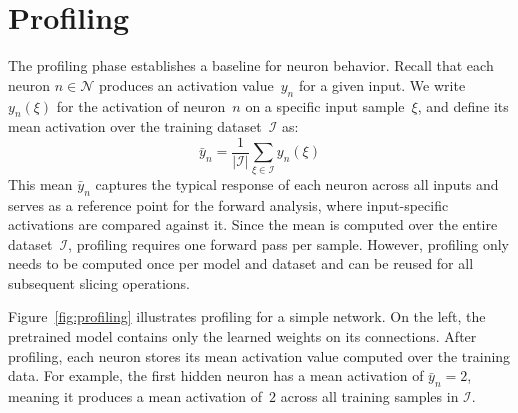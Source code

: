 \documentclass[
12pt,
fancyheadings,
a4paper,
twoside,
BCOR=0.7cm,
nobcorignoretitle,
grayscalebody,
]{stsreprt}
\begin{document}
\section{Profiling}

The profiling phase establishes a baseline for neuron behavior.
Recall that each neuron $n \in \mathcal{N}$ produces an activation value~$y_n$ for a given input.
We write $y_n(\xi)$ for the activation of neuron~$n$ on a specific input sample~$\xi$, and define
its mean activation over the training dataset~$\mathcal{I}$ as:
\begin{equation}
    \bar{y}_n = \frac{1}{|\mathcal{I}|} \sum_{\xi \in \mathcal{I}} y_n(\xi)
\end{equation}
This mean $\bar{y}_n$ captures the typical response of each neuron across all inputs and serves as
a reference point for the forward analysis, where input-specific activations are compared against
it.
Since the mean is computed over the entire dataset~$\mathcal{I}$, profiling requires one forward
pass per sample.
However, profiling only needs to be computed once per model and dataset and can be reused for all
subsequent slicing operations.

Figure~\ref{fig:profiling} illustrates profiling for a simple network.
On the left, the pretrained model contains only the learned weights on its connections.
After profiling, each neuron stores its mean activation value computed over the training data.
For example, the first hidden neuron has a mean activation of $\bar{y}_n = 2$, meaning it produces
a mean activation of~$2$ across all training samples in $\mathcal{I}$.
\end{document}
